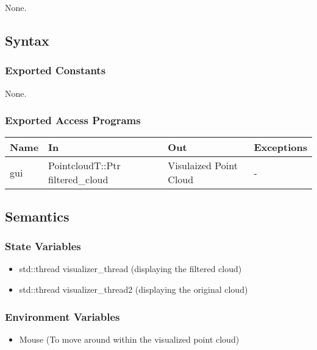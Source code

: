 \documentclass[12pt, titlepage]{article}
\begin{document}
None.

\subsection{Syntax}

\subsubsection{Exported Constants}

None.

\subsubsection{Exported Access Programs}

\begin{center}
\begin{tabular}{p{2cm} p{3cm} p{3cm} p{3cm}}
\hline
\textbf{Name} & \textbf{In} & \textbf{Out} & \textbf{Exceptions} \\
\hline
gui & PointcloudT::Ptr filtered\_cloud & Visulaized Point Cloud & - \\
\hline
\end{tabular}
\end{center}

\subsection{Semantics}

\subsubsection{State Variables}

\begin{itemize}
  \item std::thread visualizer\_thread (displaying the filtered cloud)
  \item std::thread visualizer\_thread2 (displaying the original cloud)
\end{itemize}

\subsubsection{Environment Variables}

\begin{itemize}
  \item Mouse (To move around within the visualized point cloud)
\end{itemize}
\end{document}
